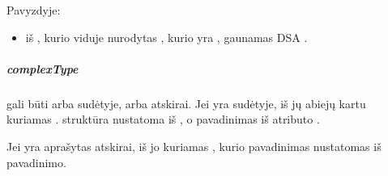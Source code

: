 \documentclass[letterpaper,10pt,lithuanian]{sphinxmanual}
\begin{document}
\sphinxAtStartPar
Pavyzdyje:
\begin{itemize}
\item {} 
\sphinxAtStartPar
iš , kurio viduje nurodytas {\hyperref[\detokenize{schemos/xsd:xsd-restriction}]{}}, kurio {\hyperref[\detokenize{schemos/xsd:xsd-base}]{}} yra ,
gaunamas DSA {\hyperref[\detokenize{dimensijos:property.type}]{}} .

\end{itemize}


\subparagraph{complexType}
\label{\detokenize{schemos/xsd:complextype}}\label{\detokenize{schemos/xsd:xsd-complextype}}
\sphinxAtStartPar
{\hyperref[\detokenize{schemos/xsd:xsd-complextype}]{}} gali būti arba {\hyperref[\detokenize{schemos/xsd:xsd-element}]{}} sudėtyje, arba atskirai.
Jei {\hyperref[\detokenize{schemos/xsd:xsd-complextype}]{}} yra {\hyperref[\detokenize{schemos/xsd:xsd-element}]{}} sudėtyje, iš jų abiejų
kartu kuriamas {\hyperref[\detokenize{formatas:model}]{}}. {\hyperref[\detokenize{formatas:model}]{}} struktūra nustatoma iš {\hyperref[\detokenize{schemos/xsd:xsd-complextype}]{}}, o
pavadinimas \sphinxhyphen{} iš {\hyperref[\detokenize{schemos/xsd:xsd-element}]{}} atributo .

\sphinxAtStartPar
Jei {\hyperref[\detokenize{schemos/xsd:xsd-complextype}]{}} yra aprašytas atskirai, iš jo kuriamas {\hyperref[\detokenize{formatas:model}]{}},
kurio pavadinimas nustatomas iš {\hyperref[\detokenize{schemos/xsd:xsd-complextype}]{}} pavadinimo.
\end{document}
